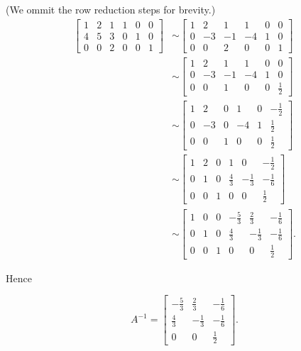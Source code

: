 \begin{solution} (We ommit the row reduction steps for brevity.)
\[
\begin{aligned}
{\left[\begin{array}{llllll}
1 & 2 & 1 & 1 & 0 & 0 \\
4 & 5 & 3 & 0 & 1 & 0 \\
0 & 0 & 2 & 0 & 0 & 1
\end{array}\right] } & \sim\left[\begin{array}{cccccc}
1 & 2 & 1 & 1 & 0 & 0 \\
0 & -3 & -1 & -4 & 1 & 0 \\
0 & 0 & 2 & 0 & 0 & 1
\end{array}\right] \\
& \sim\left[\begin{array}{cccccc}
1 & 2 & 1 & 1 & 0 & 0 \\
0 & -3 & -1 & -4 & 1 & 0 \\
0 & 0 & 1 & 0 & 0 & \frac{1}{2}
\end{array}\right] \\
& \sim\left[\begin{array}{cccccc}
1 & 2 & 0 & 1 & 0 & -\frac{1}{2} \\
0 & -3 & 0 & -4 & 1 & \frac{1}{2} \\
0 & 0 & 1 & 0 & 0 & \frac{1}{2}
\end{array}\right] \\
& \sim\left[\begin{array}{cccccc}
1 & 2 & 0 & 1 & 0 & -\frac{1}{2} \\
0 & 1 & 0 & \frac{4}{3} & -\frac{1}{3} & -\frac{1}{6} \\
0 & 0 & 1 & 0 & 0 & \frac{1}{2}
\end{array}\right] \\
& \sim\left[\begin{array}{cccccc}
1 & 0 & 0 & -\frac{5}{3} & \frac{2}{3} & -\frac{1}{6} \\
0 & 1 & 0 & \frac{4}{3} & -\frac{1}{3} & -\frac{1}{6} \\
0 & 0 & 1 & 0 & 0 & \frac{1}{2}
\end{array}\right] .
\end{aligned}
\]

Hence

\[
A^{-1}=\left[\begin{array}{ccc}
-\frac{5}{3} & \frac{2}{3} & -\frac{1}{6} \\
\frac{4}{3} & -\frac{1}{3} & -\frac{1}{6} \\
0 & 0 & \frac{1}{2}
\end{array}\right] .
\]

\end{solution}

